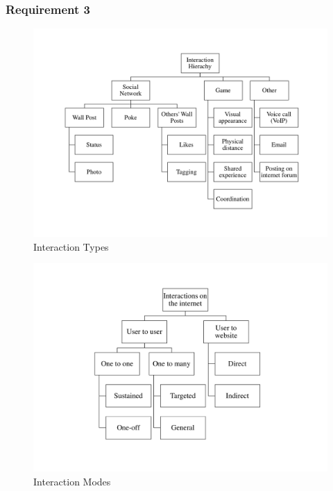 \documentclass[12pt,a4paper]{article}
\begin{document}
\subsubsection{Requirement 3}
\begin{figure}[htb]
\begin{center}
\caption{Interaction Types}
\label{fig:types}
\includegraphics[width=6in]{InteractionTypes}
\end{center}\end{figure}

\begin{figure}[htb]
\begin{center}
\caption{Interaction Modes}
\label{fig:modes}
\includegraphics[width=6in]{CategorisationsInteractions}
\end{center}
\end{figure}
\end{document}
